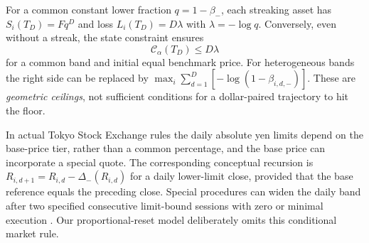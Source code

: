 \documentclass[11pt]{article}
\numberwithin{equation}{section}
\theoremstyle{definition}
\theoremstyle{remark}
\newcommand{\Cris}{\mathcal{C}}
\begin{document}
For a common constant lower fraction $q=1-\beta_-$, each streaking asset has
$S_i(T_D)=Fq^D$ and loss $L_i(T_D)=D\lambda$ with $\lambda=-\log q$. Conversely, even without a streak, the state constraint ensures
\begin{equation}\label{eq:rolling-cumulative-upper}
  \Cris_\alpha(T_D)\le D\lambda
\end{equation}
for a common band and initial equal benchmark price. For heterogeneous bands the right side can be replaced by
$\max_i\sum_{d=1}^D[-\log(1-\beta_{i,d,-})]$. These are \emph{geometric ceilings}, not sufficient conditions for a dollar-paired trajectory to hit the floor.

In actual Tokyo Stock Exchange rules the daily absolute yen limits depend on the base-price tier, rather than a common percentage, and the base price can incorporate a special quote. The corresponding conceptual recursion is $R_{i,d+1}=R_{i,d}-\Delta_-(R_{i,d})$ for a daily lower-limit close, provided that the base reference equals the preceding close. Special procedures can widen the daily band after two specified consecutive limit-bound sessions with zero or minimal execution \citep{JPX2026}. Our proportional-reset model deliberately omits this conditional market rule.
\end{document}

